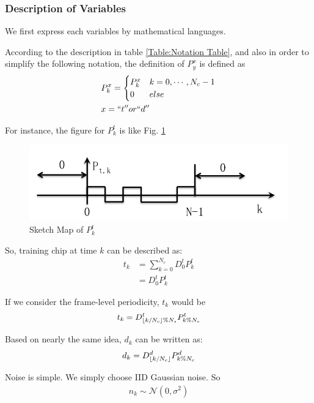 \documentclass[a4paper]{article}
\DeclarePairedDelimiter\floor{\lfloor}{\rfloor}
\begin{document}
\subsubsection{Description of Variables} %
\label{ssub:description_of_variables}
We first express each variables by mathematical languages.

According to the description in table \ref{Table:Notation Table}, and also in order to simplify the following notation, the definition of $P^x_y$ is defined as 
\begin{equation}
\begin{split}
	&P^x_k = 
	\begin{cases}
		P^x_k 	& k = 0, \cdots, N_c-1\\
		0 			& else
	\end{cases}\\
	&x = ``t'' or ``d''
\end{split}
\end{equation}

For instance, the figure for $P^t_k$ is like Fig. \ref{fig:Sketch Map of P_tk}
\begin{figure}
	\centering
	\includegraphics[width = 3.1 in]{figure/p_t_k.png}
	\caption{Sketch Map of $P^t_k$}
	\label{fig:Sketch Map of P_tk}
\end{figure}

So, training chip at time $k$ can be described as:
\begin{align}
		t_k 
	&= \sum_{k = 0}^{N_c} D^t_0 P^t_{k}\\
	&= D^t_0 P^t_k \label{eq:t_k only consider the cyclic property of symbol level}
\end{align}

If we consider the frame-level periodicity, $t_k$ would be
\begin{align}
	t_k = D^t_{\floor{k / N_c} \% N_s} P^t_{k \% N_c}
\end{align}

Based on nearly the same idea, $d_k$ can be written as:
\begin{align}
	d_k = D^d_{\floor{k / N_c}} P^d_{k \% N_c}
\end{align}

Noise is simple. We simply choose IID Gaussian noise. So
\begin{align}
	n_k \sim \mathcal{N}(0, \sigma^2)
\end{align}
\end{document}
